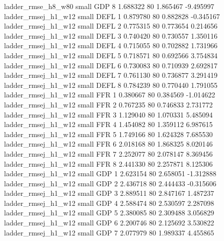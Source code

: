       ladder_rmse_h8_w80      small      GDP                 8 1.688322 80       1.865467          -9.495997
     ladder_rmsej_h1_w12      small     DEFL                 1 0.879780 80       0.882828          -0.345167
     ladder_rmsej_h1_w12      small     DEFL                 2 0.775315 80       0.773654           0.214656
     ladder_rmsej_h1_w12      small     DEFL                 3 0.740420 80       0.730557           1.350116
     ladder_rmsej_h1_w12      small     DEFL                 4 0.715055 80       0.702882           1.731966
     ladder_rmsej_h1_w12      small     DEFL                 5 0.718571 80       0.692566           3.754834
     ladder_rmsej_h1_w12      small     DEFL                 6 0.730083 80       0.710939           2.692817
     ladder_rmsej_h1_w12      small     DEFL                 7 0.761130 80       0.736877           3.291419
     ladder_rmsej_h1_w12      small     DEFL                 8 0.784239 80       0.770440           1.791055
     ladder_rmsej_h1_w12      small      FFR                 1 0.380667 80       0.384569          -1.014622
     ladder_rmsej_h1_w12      small      FFR                 2 0.767235 80       0.746833           2.731772
     ladder_rmsej_h1_w12      small      FFR                 3 1.129040 80       1.070331           5.485094
     ladder_rmsej_h1_w12      small      FFR                 4 1.454082 80       1.359112           6.987615
     ladder_rmsej_h1_w12      small      FFR                 5 1.749166 80       1.624328           7.685530
     ladder_rmsej_h1_w12      small      FFR                 6 2.018168 80       1.868325           8.020146
     ladder_rmsej_h1_w12      small      FFR                 7 2.252077 80       2.078147           8.369456
     ladder_rmsej_h1_w12      small      FFR                 8 2.441330 80       2.257871           8.125306
     ladder_rmsej_h1_w12      small      GDP                 1 2.623154 80       2.658051          -1.312888
     ladder_rmsej_h1_w12      small      GDP                 2 2.436718 80       2.444433          -0.315606
     ladder_rmsej_h1_w12      small      GDP                 3 2.889511 80       2.847167           1.487237
     ladder_rmsej_h1_w12      small      GDP                 4 2.588474 80       2.530597           2.287098
     ladder_rmsej_h1_w12      small      GDP                 5 2.380085 80       2.309488           3.056829
     ladder_rmsej_h1_w12      small      GDP                 6 2.200746 80       2.125692           3.530822
     ladder_rmsej_h1_w12      small      GDP                 7 2.077979 80       1.989337           4.455865
